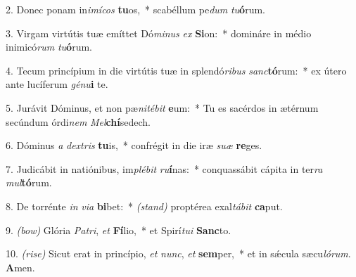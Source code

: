  2. Donec ponam in\textit{i}\textit{mí}\textit{cos} \textbf{tu}os,~* 
 	scabéllum pe\textit{dum} \textit{tu}\textbf{ó}rum.

3. Virgam virtútis tuæ emíttet Dó\textit{mi}\textit{nus} \textit{ex} \textbf{Si}on:~* 
	domináre in médio inimicó\textit{rum} \textit{tu}\textbf{ó}rum.

4. Tecum princípium in die virtútis tuæ in splendó\textit{ri}\textit{bus} \textit{sanc}\textbf{tó}rum:~* 
	ex útero ante lucíferum \textit{gé}\textit{nu}\textbf{i} te.

5. Jurávit Dóminus, et non pæ\textit{ni}\textit{té}\textit{bit} \textbf{e}um:~* 
	Tu es sacérdos in ætérnum secúndum órdi\textit{nem} \textit{Mel}\textbf{chí}sedech.

6. Dóminus \textit{a} \textit{dex}\textit{tris} \textbf{tu}is,~* 
	confrégit in die iræ \textit{su}\textit{æ} \textbf{re}ges.

7. Judicábit in natiónibus, im\textit{plé}\textit{bit} \textit{ru}\textbf{í}nas:~* 
	conquassábit cápita in ter\textit{ra} \textit{mul}\textbf{tó}rum.

8. De torrénte \textit{in} \textit{vi}\textit{a} \textbf{bi}bet:~* 
	{\color{red}\textit{(stand)}} proptérea exal\textit{tá}\textit{bit} \textbf{ca}put.

9. {\color{red}\textit{(bow)}} Glória \textit{Pa}\textit{tri}, \textit{et} \textbf{Fí}lio,~*
	et Spirí\textit{tu}\textit{i} \textbf{Sanc}to.

10. {\color{red}\textit{(rise)}} Sicut erat in princípio, \textit{et} \textit{nunc}, \textit{et} \textbf{sem}per,~* 
	et in s\'{\ae}cula sæcu\textit{ló}\textit{rum}. \textbf{A}men.
